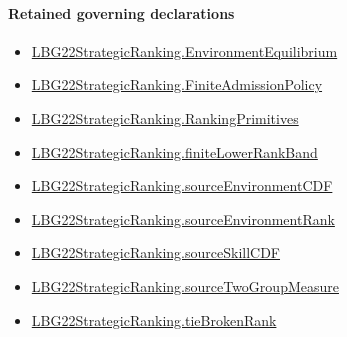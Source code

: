 \documentclass[10pt]{article}
\begin{document}
\paragraph{Retained governing declarations}
\begin{itemize}\raggedright
\item \hyperlink{paper-prerequisite-b8e06f39e94d0049}{LBG22\allowbreak{}Strategic\allowbreak{}Ranking.\allowbreak{}Environment\allowbreak{}Equilibrium}
\item \hyperlink{paper-prerequisite-d056dd7c8060653c}{LBG22\allowbreak{}Strategic\allowbreak{}Ranking.\allowbreak{}Finite\allowbreak{}Admission\allowbreak{}Policy}
\item \hyperlink{paper-prerequisite-9bbcc12f4a1736bf}{LBG22\allowbreak{}Strategic\allowbreak{}Ranking.\allowbreak{}Ranking\allowbreak{}Primitives}
\item \hyperlink{paper-prerequisite-a42f440ddc254fa7}{LBG22\allowbreak{}Strategic\allowbreak{}Ranking.\allowbreak{}finite\allowbreak{}Lower\allowbreak{}Rank\allowbreak{}Band}
\item \hyperlink{paper-prerequisite-1aae1cdeecf21463}{LBG22\allowbreak{}Strategic\allowbreak{}Ranking.\allowbreak{}source\allowbreak{}Environment\allowbreak{}CDF}
\item \hyperlink{paper-prerequisite-b308d7da226a5fe1}{LBG22\allowbreak{}Strategic\allowbreak{}Ranking.\allowbreak{}source\allowbreak{}Environment\allowbreak{}Rank}
\item \hyperlink{governing-declaration-15b79809af308d40}{LBG22\allowbreak{}Strategic\allowbreak{}Ranking.\allowbreak{}source\allowbreak{}Skill\allowbreak{}CDF}
\item \hyperlink{paper-prerequisite-5b3be494cde30a37}{LBG22\allowbreak{}Strategic\allowbreak{}Ranking.\allowbreak{}source\allowbreak{}Two\allowbreak{}Group\allowbreak{}Measure}
\item \hyperlink{paper-prerequisite-b7c71e53177b76c6}{LBG22\allowbreak{}Strategic\allowbreak{}Ranking.\allowbreak{}tie\allowbreak{}Broken\allowbreak{}Rank}
\end{itemize}
\end{document}
